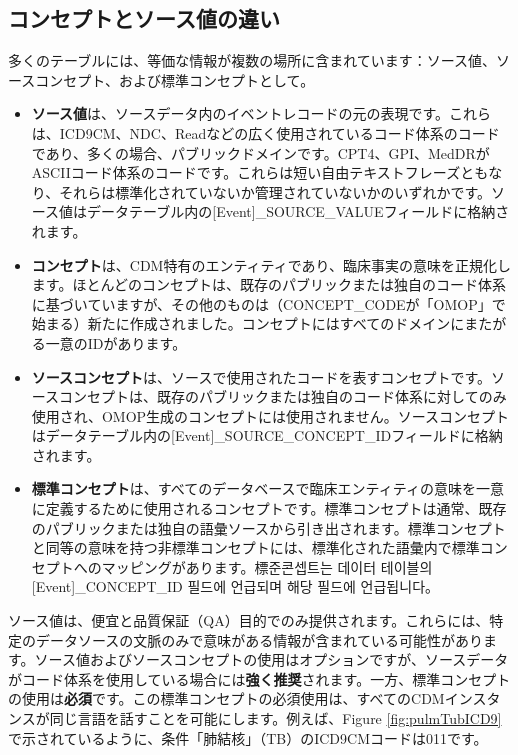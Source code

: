 \documentclass[
  11pt]{book}
\providecommand{\tightlist}{%
  \setlength{\itemsep}{0pt}\setlength{\parskip}{0pt}}
\theoremstyle{definition}
\theoremstyle{definition}
\theoremstyle{definition}
\theoremstyle{definition}
\theoremstyle{remark}
\begin{document}
\subsection{コンセプトとソース値の違い}\label{concepts-Sources}

多くのテーブルには、等価な情報が複数の場所に含まれています：ソース値、ソースコンセプト、および標準コンセプトとして。

\begin{itemize}
\tightlist
\item
  \textbf{ソース値}は、ソースデータ内のイベントレコードの元の表現です。これらは、ICD9CM、NDC、Readなどの広く使用されているコード体系のコードであり、多くの場合、パブリックドメインです。CPT4、GPI、MedDRがASCIIコード体系のコードです。これらは短い自由テキストフレーズともなり、それらは標準化されていないか管理されていないかのいずれかです。ソース値はデータテーブル内の{[}Event{]}\_SOURCE\_VALUEフィールドに格納されます。
\item
  \textbf{コンセプト}は、CDM特有のエンティティであり、臨床事実の意味を正規化します。ほとんどのコンセプトは、既存のパブリックまたは独自のコード体系に基づいていますが、その他のものは（CONCEPT\_CODEが「OMOP」で始まる）新たに作成されました。コンセプトにはすべてのドメインにまたがる一意のIDがあります。
\item
  \textbf{ソースコンセプト}は、ソースで使用されたコードを表すコンセプトです。ソースコンセプトは、既存のパブリックまたは独自のコード体系に対してのみ使用され、OMOP生成のコンセプトには使用されません。ソースコンセプトはデータテーブル内の{[}Event{]}\_SOURCE\_CONCEPT\_IDフィールドに格納されます。
\item
  \textbf{標準コンセプト}は、すべてのデータベースで臨床エンティティの意味を一意に定義するために使用されるコンセプトです。標準コンセプトは通常、既存のパブリックまたは独自の語彙ソースから引き出されます。標準コンセプトと同等の意味を持つ非標準コンセプトには、標準化された語彙内で標準コンセプトへのマッピングがあります。標준콘셉트는 데이터 테이블의 {[}Event{]}\_CONCEPT\_ID 필드에 언급되며 해당 필드에 언급됩니다。
\end{itemize}

ソース値は、便宜と品質保証（QA）目的でのみ提供されます。これらには、特定のデータソースの文脈のみで意味がある情報が含まれている可能性があります。ソース値およびソースコンセプトの使用はオプションですが、ソースデータがコード体系を使用している場合には\textbf{強く推奨}されます。一方、標準コンセプトの使用は\textbf{必須}です。この標準コンセプトの必須使用は、すべてのCDMインスタンスが同じ言語を話すことを可能にします。例えば、Figure \ref{fig:pulmTubICD9} で示されているように、条件「肺結核」（TB）のICD9CMコードは011です。
\end{document}
